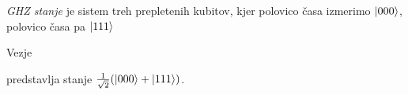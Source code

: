 \documentclass[mat1]{fmfdelo}
\begin{document}
\emph{GHZ stanje} je sistem treh prepletenih kubitov, kjer polovico časa izmerimo \(\ket{000}\), polovico časa pa \(\ket{111}\)
\begin{izrek}
    Vezje
    \begin{center}
    \end{center}
    predstavlja stanje \(\frac{1}{\sqrt2}(\ket{000}+\ket{111})\).
\end{izrek}
\end{document}
